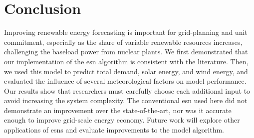 \section{Conclusion}

Improving renewable energy forecasting is important for grid-planning
and unit commitment, especially as the share of variable renewable resources
increases, challenging the baseload power from nuclear plants. We first
demonstrated that our implementation of the \gls{esn} algorithm is consistent
with the literature. Then, we used this model to predict
total demand, solar energy, and wind energy, and evaluated the influence of
several meteorological factors on model performance. Our results show that
researchers must carefully choose each additional input to avoid increasing the
system complexity.
The conventional \gls{esn} used here did not demonstrate an
improvement over the state-of-the-art, nor was it accurate enough to improve
grid-scale energy economy. Future work will explore other applications of
\glspl{esn} and evaluate improvements to the model algorithm.
